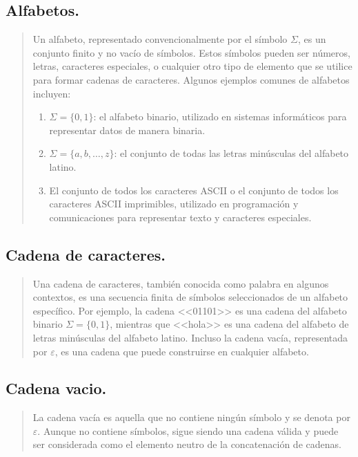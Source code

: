 \documentclass{article}
\begin{document}
    \subsection{Alfabetos.}
        \begin{quote}
            Un alfabeto, representado convencionalmente por el símbolo $\Sigma$, es un conjunto finito y no vacío de símbolos.
            Estos símbolos pueden ser números, letras, caracteres especiales, o cualquier otro tipo de elemento que se utilice para formar
            cadenas de caracteres. Algunos ejemplos comunes de alfabetos incluyen:

            \begin{enumerate}
                \item $\Sigma=\{0,1\}$: el alfabeto binario, utilizado en sistemas informáticos para representar datos de manera binaria.
                \item $\Sigma=\{a,b,\ldots,z\}$: el conjunto de todas las letras minúsculas del alfabeto latino.
                \item El conjunto de todos los caracteres ASCII o el conjunto de todos los caracteres ASCII imprimibles, utilizado en programación y comunicaciones
                para representar texto y caracteres especiales.\cite{hopcroft2007introduccion}
            \end{enumerate}
        \end{quote}
    \subsection{Cadena de caracteres.}
        \begin{quote}
            Una cadena de caracteres, también conocida como palabra en algunos contextos, es una secuencia finita de símbolos seleccionados de
            un alfabeto específico. Por ejemplo, la cadena <<01101>> es una cadena del alfabeto binario $\Sigma = \{0,1\}$, mientras que <<hola>>
            es una cadena del alfabeto de letras minúsculas del alfabeto latino. Incluso la cadena vacía, representada por $\varepsilon$, es
            una cadena que puede construirse en cualquier alfabeto.\cite{hopcroft2007introduccion}
        \end{quote}
    \subsection{Cadena vacio.}
        \begin{quote}
            La cadena vacía es aquella que no contiene ningún símbolo y se denota por $\varepsilon$. Aunque no contiene símbolos, sigue
            siendo una cadena válida y puede ser considerada como el elemento neutro de la concatenación de cadenas.\cite{hopcroft2007introduccion}
        \end{quote}
\end{document}
